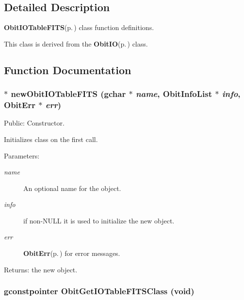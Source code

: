 \subsection{Detailed Description}
{\bf Obit\-IOTable\-FITS}{\rm (p.\,\pageref{structObitIOTableFITS})} class function definitions. 

This class is derived from the {\bf Obit\-IO}{\rm (p.\,\pageref{structObitIO})} class.

\subsection{Function Documentation}
\subsubsection{$\ast$ new\-Obit\-IOTable\-FITS (gchar $\ast$ {\em name}, {\bf Obit\-Info\-List} $\ast$ {\em info}, {\bf Obit\-Err} $\ast$ {\em err})}\label{ObitIOTableFITS_8c_a12}


Public: Constructor. 

Initializes class on the first call. \begin{Desc}
\item[Parameters:]
\begin{description}
\item[{\em name}]An optional name for the object. \item[{\em info}]if non-NULL it is used to initialize the new object. \item[{\em err}]{\bf Obit\-Err}{\rm (p.\,\pageref{structObitErr})} for error messages. \end{description}
\end{Desc}
\begin{Desc}
\item[Returns:]the new object. \end{Desc}
\subsubsection{\setlength{\rightskip}{0pt plus 5cm}gconstpointer Obit\-Get\-IOTable\-FITSClass (void)}\label{ObitIOTableFITS_8c_a16}


